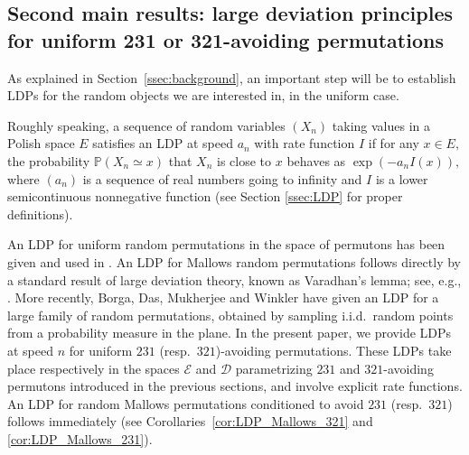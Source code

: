 \documentclass[a4paper,11pt]{amsart}
\theoremstyle{definition}
\begin{document}
\subsection{Second main results: large deviation principles for uniform 231 or 321-avoiding permutations}
\label{subseq:LDPintro}

As explained in Section~\ref{ssec:background}, an important step will be to establish LDPs for the random objects we are interested in, in the uniform case.

Roughly speaking, a sequence of random variables $(X_n)$ taking values in a Polish space $E$ satisfies an LDP at
speed $a_n$ with rate function $I$ if for any $x \in E,$ the probability $\mathbb P(X_n \simeq x)$ that $X_n$ is close to $x$ behaves as $\exp(-a_n I(x)),$ where $(a_n)$ is a sequence of real numbers going to infinity and $I$ is a lower semicontinuous nonnegative function (see Section \ref{ssec:LDP} for proper definitions).


An LDP for uniform random permutations in the space of permutons has been given and used in
\cite{trashorras2008large_deviations,mukherjee2016exponential_permutations,kenyon2020fixed_densities}.
An LDP for Mallows random permutations follows directly by a standard result
of large deviation theory, known as Varadhan's lemma; 
see, e.g., \cite[Theorem D.8]{anderson2010BookRandomMatrix}.
More recently, Borga, Das, Mukherjee and Winkler \cite{borga2024LDP_samples} have given an LDP for a large family 
of random permutations, obtained by sampling i.i.d.~random points from a probability measure in the plane.
In the present paper, we provide LDPs at speed $n$ for uniform $231$ (resp.~$321$)-avoiding permutations.
These LDPs take place respectively in the spaces $\mathcal E$ and $\mathcal D$ parametrizing $231$ and $321$-avoiding permutons introduced in the previous sections, and involve explicit  rate functions.
An LDP for random Mallows permutations conditioned to avoid $231$ (resp.~$321$) follows immediately (see Corollaries~\ref{cor:LDP_Mallows_321} and \ref{cor:LDP_Mallows_231}).
\medskip
\end{document}
